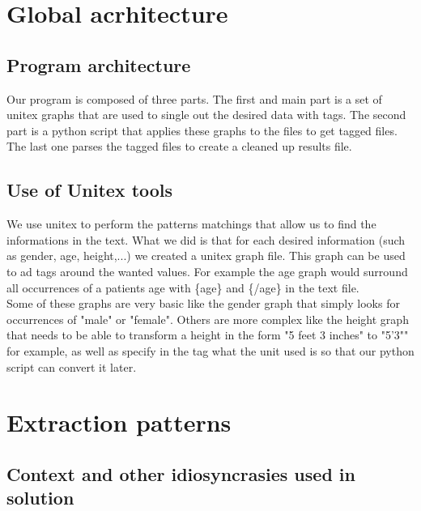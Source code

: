 \documentclass{eplDoc}
\begin{document}
\maketitle
\newpage

\section{Global acrhitecture}

\subsection{Program architecture}

Our program is composed of three parts. The first and main part is a set of unitex graphs that are used to single out the desired data with tags. The second part is a python script that applies these graphs to the files to get tagged files. The last one parses the tagged files to create a cleaned up results file. 

\subsection{Use of Unitex tools}

We use unitex to perform the patterns matchings that allow us to find the informations in the text. What we did is that for each desired information (such as gender, age, height,...) we created a unitex graph file. This graph can be used to ad tags around the wanted values. For example the age graph would surround all occurrences of a patients age with \{age\} and \{/age\} in the text file. \\ 
Some of these graphs are very basic like the gender graph that simply looks for occurrences of "male" or "female". Others are more complex like the height graph that needs to be able to transform a height in the form "5 feet 3 inches" to "5'3"" for example, as well as specify in the tag what the unit used is so that our python script can convert it later. 

\section{Extraction patterns}

\subsection{Context and other idiosyncrasies used in solution}
\end{document}
